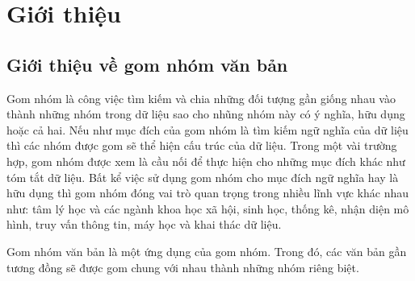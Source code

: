 \chapter{Giới thiệu}
\label{Chapter1}

\section{Giới thiệu về gom nhóm văn bản}

Gom nhóm là công việc tìm kiếm và chia những đối tượng gần giống nhau vào thành những nhóm trong dữ liệu sao cho nhũng nhóm này có ý nghĩa, hữu dụng hoặc cả hai. %
Nếu như mục đích của gom nhóm là tìm kiếm ngữ nghĩa của dữ liệu thì các nhóm được gom sẽ thể hiện cấu trúc của dữ liệu.
Trong một vài trường hợp, gom nhóm được xem là cầu nối để thực hiện cho những mục đích khác như tóm tắt dữ liệu.
Bất kể việc sử dụng gom nhóm cho mục đích ngữ nghĩa hay là hữu dụng thì gom nhóm đóng vai trò quan trọng trong nhiều lĩnh vực khác nhau như: tâm lý học và các ngành khoa học xã hội, sinh học, thống kê, nhận diện mô hình, truy vấn thông tin, máy học và khai thác dữ liệu.

Gom nhóm văn bản là một ứng dụng của gom nhóm.
Trong đó, các văn bản gần tương đồng sẽ được gom chung với nhau thành những nhóm riêng biệt.


